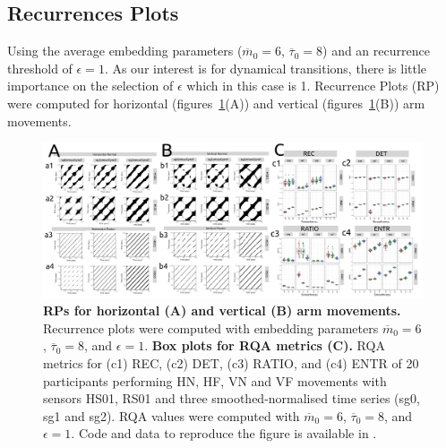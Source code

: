 \documentclass[fleqn,10pt]{wlscirep}
\begin{document}
\subsection*{Recurrences Plots}
Using the average embedding parameters ($\overline{m}_0=6$, $\overline{\tau}_0=8$) and an recurrence threshold of $\epsilon=1$.
As our interest is for dynamical transitions, there is little importance on the selection of $\epsilon$ which in this case is 1.
Recurrence Plots (RP) were computed for horizontal (figures~\ref{fig05}(A)) and vertical (figures~\ref{fig05}(B)) arm movements.
\begin{figure}[ht]
\centering
\includegraphics[width=1.0\textwidth]{figures/fig05/versions/drawing-v01}
\caption{
	{\bf RPs for horizontal (A) and vertical (B) arm movements.}	
	Recurrence plots were computed with embedding parameters
	$\overline{m}_0=6$, $\overline{\tau}_0=8$, and $\epsilon=1$.
	{\bf Box plots for RQA metrics (C).}
	RQA metrics for (c1) REC, (c2) DET, (c3) RATIO, and (c4) ENTR of 20 participants performing HN, HF, VN and VF movements with sensors HS01, RS01 and three smoothed-normalised time series (sg0, sg1 and sg2).
	RQA values were computed with $\overline{m}_0=6$, $\overline{\tau}_0=8$, and $\epsilon=1$.
	Code and data to reproduce the figure is available in \cite{srep2021}.
        }
    \label{fig05}
\end{figure}
\end{document}
